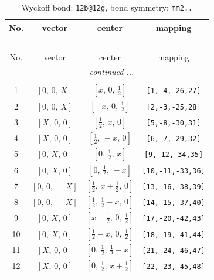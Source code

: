 \documentclass[fleqn,8pt]{jsarticle}
\begin{document}
\renewcommand{\arraystretch}{1.2}
\begin{longtable}{cccc}
\caption{Wyckoff bond: {\tt 12b@12g}, bond symmetry: {\tt mm2..}}
 \\
 \hline \hline
No. & vector & center & mapping \\ \hline \endfirsthead

\multicolumn{3}{l}{\tablename\ \thetable{}} \\
 \hline \hline
No. & vector & center & mapping \\ \hline \endhead

 \hline \hline
\multicolumn{3}{r}{\footnotesize\it continued ...} \\ \endfoot

 \hline \hline
\multicolumn{3}{r}{} \\ \endlastfoot

1 & $\left[ 0,\, 0,\, X \right]$ & $\left[ x,\, 0,\, \frac{1}{2} \right]$ & {\tt [1,-4,-26,27]} \\ \hline
2 & $\left[ 0,\, 0,\, X \right]$ & $\left[ - x,\, 0,\, \frac{1}{2} \right]$ & {\tt [2,-3,-25,28]} \\ \hline
3 & $\left[ X,\, 0,\, 0 \right]$ & $\left[ \frac{1}{2},\, x,\, 0 \right]$ & {\tt [5,-8,-30,31]} \\ \hline
4 & $\left[ X,\, 0,\, 0 \right]$ & $\left[ \frac{1}{2},\, - x,\, 0 \right]$ & {\tt [6,-7,-29,32]} \\ \hline
5 & $\left[ 0,\, X,\, 0 \right]$ & $\left[ 0,\, \frac{1}{2},\, x \right]$ & {\tt [9,-12,-34,35]} \\ \hline
6 & $\left[ 0,\, X,\, 0 \right]$ & $\left[ 0,\, \frac{1}{2},\, - x \right]$ & {\tt [10,-11,-33,36]} \\ \hline
7 & $\left[ 0,\, 0,\, - X \right]$ & $\left[ \frac{1}{2},\, x + \frac{1}{2},\, 0 \right]$ & {\tt [13,-16,-38,39]} \\ \hline
8 & $\left[ 0,\, 0,\, - X \right]$ & $\left[ \frac{1}{2},\, \frac{1}{2} - x,\, 0 \right]$ & {\tt [14,-15,-37,40]} \\ \hline
9 & $\left[ 0,\, X,\, 0 \right]$ & $\left[ x + \frac{1}{2},\, 0,\, \frac{1}{2} \right]$ & {\tt [17,-20,-42,43]} \\ \hline
10 & $\left[ 0,\, X,\, 0 \right]$ & $\left[ \frac{1}{2} - x,\, 0,\, \frac{1}{2} \right]$ & {\tt [18,-19,-41,44]} \\ \hline
11 & $\left[ X,\, 0,\, 0 \right]$ & $\left[ 0,\, \frac{1}{2},\, \frac{1}{2} - x \right]$ & {\tt [21,-24,-46,47]} \\ \hline
12 & $\left[ X,\, 0,\, 0 \right]$ & $\left[ 0,\, \frac{1}{2},\, x + \frac{1}{2} \right]$ & {\tt [22,-23,-45,48]} \\
\end{longtable}
\end{document}

